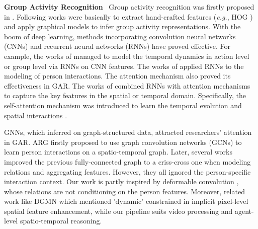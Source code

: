 \documentclass[10pt,twocolumn,letterpaper]{article}
\begin{document}
\textbf{Group Activity Recognition} \ Group activity recognition was firstly proposed in \cite{choi2009they}. Following works \cite{choi2011learningcontext,lan2011discriminative,lan2012social,choi2012aunifiedframework,amer2014hirf} were basically to extract hand-crafted features (\textit{e.g.}, HOG \cite{dalal2005HOG}) and apply graphical models to infer group activity representations. With the boom of deep learning, methods incorporating convolution neural networks (CNNs) and recurrent neural networks (RNNs) have proved effective. For example, the works of \cite{ibrahim2016hierarchical,bagautdinov2017social} managed to model the temporal dynamics in action level or group level via RNNs on CNN features. The works of \cite{wang2017merge_two_class,yan2018pctdm,qi2018stagnet,2019hierarchical_longshortterm} applied RNNs to the modeling of person interactions. The attention mechanism also proved its effectiveness in GAR. The works of \cite{yan2018pctdm,qi2018stagnet,tang2019coherence} combined RNNs with attention mechanisms to capture the key features in the spatial or temporal domain. Specifically, the self-attention mechanism was introduced to learn the temporal evolution and spatial interactions \cite{gavrilyuk2020actor,pramono2020eccvempowering}. 



GNNs, which inferred on graph-structured data, attracted researchers' attention in GAR. ARG \cite{wu2019learning} firstly proposed to use graph convolution networks (GCNs) to learn person interactions on a spatio-temporal graph. Later, several works \cite{yan2020higcin,pramono2020eccvempowering,weaklyGAR} improved the previous fully-connected graph to a criss-cross one when modeling relations and aggregating features. However, they all ignored the person-specific interaction context. Our work is partly inspired by deformable convolution \cite{dai2017dcnv1,zhu2019dcnv2}, whose relations are not conditioning on the person features. Moreover, related work like DGMN \cite{zhang2020DGMN} which mentioned 'dynamic' constrained in implicit pixel-level spatial feature enhancement, while our pipeline suits video processing and agent-level spatio-temporal reasoning.
\end{document}
